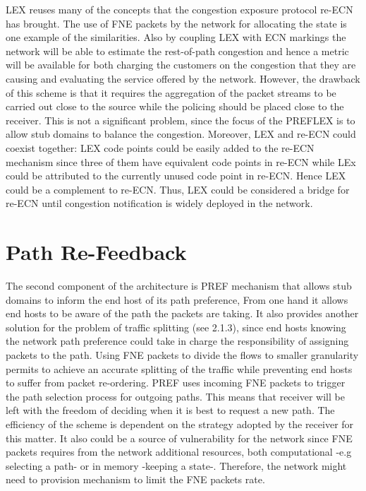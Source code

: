 LEX reuses many of the concepts that the congestion exposure protocol re-ECN has brought. The use of FNE packets by the network for allocating the state is one example of the similarities. Also by coupling LEX with ECN markings the network will be able to estimate the rest-of-path congestion and hence a metric will be available for both charging the customers on the congestion that they are causing and evaluating the service offered by the network. However, the drawback of this scheme is that it requires the aggregation of the packet streams to be carried out close to the source while the policing should be placed close to the receiver. This is not a significant problem, since the focus of the PREFLEX is to allow stub domains to balance the congestion. Moreover, LEX and re-ECN could coexist together: LEX code points could be easily added to the re-ECN mechanism since three of them have equivalent code points in re-ECN while LEx could be attributed to the currently unused code point in re-ECN. Hence LEX could be a complement to re-ECN. Thus, LEX could be considered a bridge for re-ECN until congestion notification is widely deployed in the network.

\section{Path Re-Feedback}

The second component of the architecture is PREF mechanism that allows stub domains to inform the end host of its path preference, From one hand it allows end hosts to be aware of the path the packets are taking. It also provides another solution for the problem of traffic splitting (see 2.1.3), since end hosts knowing the network path preference could take in charge the responsibility of assigning packets to the path. Using FNE packets to divide the flows to smaller granularity permits to achieve an accurate splitting of the traffic while preventing end hosts to suffer from packet re-ordering. PREF uses incoming FNE packets to trigger the path selection process for outgoing paths. This means that receiver will be left with the freedom of deciding when it is best to request a new path. The efficiency of the scheme is dependent on the strategy adopted by the receiver for this matter. It also could be a source of vulnerability for the network since FNE packets requires from the network  additional resources, both computational -e.g selecting a path- or in memory -keeping a state-. Therefore, the network might need to provision mechanism to limit the FNE packets rate.

